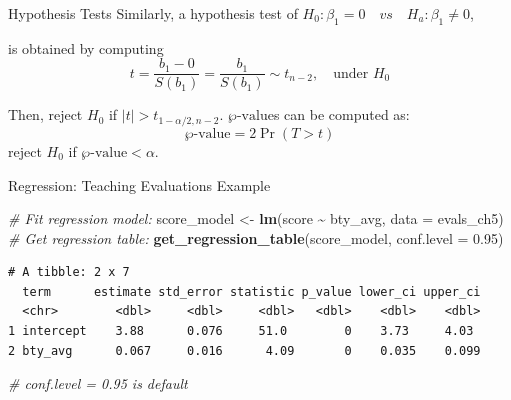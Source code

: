 \documentclass[
  ignorenonframetext,
]{beamer}
\newenvironment{Shaded}{\begin{snugshade}}{\end{snugshade}}
\newcommand{\AttributeTok}[1]{\textcolor[rgb]{0.13,0.29,0.53}{#1}}
\newcommand{\CommentTok}[1]{\textcolor[rgb]{0.56,0.35,0.01}{\textit{#1}}}
\newcommand{\FloatTok}[1]{\textcolor[rgb]{0.00,0.00,0.81}{#1}}
\newcommand{\FunctionTok}[1]{\textcolor[rgb]{0.13,0.29,0.53}{\textbf{#1}}}
\newcommand{\NormalTok}[1]{#1}
\newcommand{\OtherTok}[1]{\textcolor[rgb]{0.56,0.35,0.01}{#1}}
\newcommand{\SpecialCharTok}[1]{\textcolor[rgb]{0.81,0.36,0.00}{\textbf{#1}}}
\begin{document}
\begin{frame}{Hypothesis Tests}
\protect\hypertarget{hypothesis-tests-1}{}
Similarly, a hypothesis test of
\(H_0: \beta_1=0\quad vs \quad H_a: \beta_1\neq0\),

is obtained by computing
\[ t=\frac{b_1-0}{S(b_1)}=\frac{b_1}{S(b_1)}\sim t_{n-2}, \quad \text{under } H_0\]

Then, reject \(H_0\) if \(|t|>t_{1-\alpha/2, n-2}\).
\(\wp\text{-value}\)s can be computed as: \[\wp\text{-value}=2\Pr(T>t)\]
reject \(H_0\) if \(\wp\text{-value}<\alpha\).
\end{frame}

\begin{frame}[fragile]{Regression: Teaching Evaluations Example}
\protect\hypertarget{regression-teaching-evaluations-example-7}{}
\small

\begin{Shaded}
\begin{Highlighting}[]
\CommentTok{\# Fit regression model:}
\NormalTok{score\_model }\OtherTok{\textless{}{-}} \FunctionTok{lm}\NormalTok{(score }\SpecialCharTok{\textasciitilde{}}\NormalTok{ bty\_avg, }\AttributeTok{data =}\NormalTok{ evals\_ch5)}
\CommentTok{\# Get regression table:}
\FunctionTok{get\_regression\_table}\NormalTok{(score\_model, }\AttributeTok{conf.level =} \FloatTok{0.95}\NormalTok{) }
\end{Highlighting}
\end{Shaded}

\begin{verbatim}
# A tibble: 2 x 7
  term      estimate std_error statistic p_value lower_ci upper_ci
  <chr>        <dbl>     <dbl>     <dbl>   <dbl>    <dbl>    <dbl>
1 intercept    3.88      0.076     51.0        0    3.73     4.03 
2 bty_avg      0.067     0.016      4.09       0    0.035    0.099
\end{verbatim}

\begin{Shaded}
\begin{Highlighting}[]
\CommentTok{\# conf.level = 0.95 is default}
\end{Highlighting}
\end{Shaded}

\normalsize
\end{frame}
\end{document}
